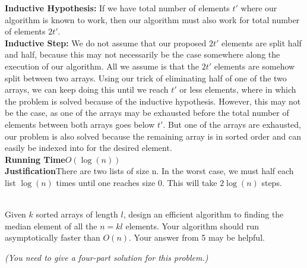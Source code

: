 \begin{qunlist}
{\textbf{Inductive Hypothesis:} If we have total number of elements $t'$ where our algorithm is known to work, then our algorithm must also work for total number of elements $2t'$.
\\
\textbf{Inductive Step:} We do not assume that our proposed $2t'$ elements are split half and half, because this may not necessarily be the case somewhere along the execution of our algorithm. All we assume is that the $2t'$ elements are somehow split between two arrays. Using our trick of eliminating half of one of the two arrays, we can keep doing this until we reach $t'$ or less elements, where in which the problem is solved because of the inductive hypothesis. However, this may not be the case, as one of the arrays may be exhausted before the total number of elements between both arrays goes below $t'$. But one of the arrays are exhausted, our problem is also solved because the remaining array is in sorted order and can easily be indexed into for the desired element. 
 \\ 
\textbf{Running Time}$O(\log(n))$\\
\textbf{Justification}There are two lists of size n. In the worst case, we must half each list $\log(n)$ times until one reaches size 0. This will take $2\log(n)$ steps.
}

 \\
Given $k$ sorted arrays of length $l$, design an efficient algorithm to finding the median element of all the $n=kl$ elements. Your algorithm should run  asymptotically faster than $O(n)$. Your answer from 5 may be helpful.

{\em (You need to give a four-part solution for this problem.)}


\end{qunlist}

